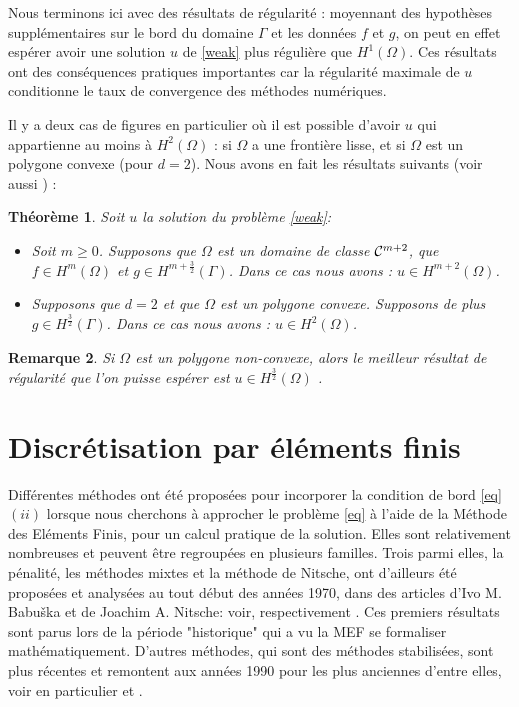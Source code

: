 \documentclass[11pt]{book}
\newtheorem{theorem}{Théorème}[section]
\newtheorem{remark}[theorem]{Remarque}
\newcommand{\bt}{\begin{theorem}}
\newcommand{\et}{\end{theorem}}
\newcommand{\br}{\begin{remark}}
\newcommand{\er}{\end{remark}}
\newcommand{\caC}{{\cal C}}
\begin{document}
Nous terminons ici avec des résultats de régularité : moyennant des hypothèses supplémentaires sur le bord du domaine $\Gamma$ et les données $f$ et $g$, on peut en effet espérer avoir une solution $u$ de \eqref{weak} plus régulière que $H^1(\Omega)$. Ces résultats ont des conséquences pratiques importantes car la régularité maximale de $u$ conditionne le taux de convergence des méthodes numériques.

Il y a deux cas de figures en particulier où il est possible d'avoir $u$ qui appartienne au moins à $H^2(\Omega)$ : si $\Omega$ a une frontière lisse, et si $\Omega$ est un polygone convexe (pour $d=2$). Nous avons en fait les résultats suivants \cite[Theorem 3.10, Theorem 3.12]{ern-guermond-04} (voir aussi \cite{grisvard-85,grisvard-86}) :

\bt Soit $u$ la solution du problème \eqref{weak}:
\begin{itemize}
\item Soit $m\geq0$. Supposons que $\Omega$ est un domaine de classe $\caC^{m+2}$, que $f \in H^m(\Omega)$ et $g \in H^{m+\frac32} (\Gamma)$. Dans ce cas nous avons : $u \in H^{m+2} (\Omega)$.
\item Supposons que $d=2$ et que $\Omega$ est un polygone convexe. Supposons de plus $g\in H^{\frac32} (\Gamma)$. Dans ce cas nous avons : $u\in H^2(\Omega)$.
\end{itemize}
\et

\br
Si $\Omega$ est un polygone non-convexe, alors le meilleur résultat de régularité que l'on puisse espérer est $u\in H^{\frac32} (\Omega)$ \cite[Remark 3.13]{ern-guermond-04}.
\er

\section{Discrétisation par éléments finis}
\label{sect:fem}

Différentes méthodes ont été proposées pour incorporer la condition de bord \eqref{eq} $(ii)$ lorsque nous cherchons à approcher le problème \eqref{eq} à l'aide de la Méthode des Eléments Finis, pour un calcul pratique de la solution. Elles sont relativement nombreuses et peuvent être regroupées en plusieurs familles. Trois parmi elles, la pénalité, les méthodes mixtes et la méthode de Nitsche, ont d'ailleurs été proposées et analysées au tout début des années 1970, dans des articles d'Ivo M. Babu\v{s}ka et de Joachim A. Nitsche: voir, respectivement  \cite{babuska-73a,babuska-73b,nitsche-71}. Ces premiers résultats sont parus lors de la période "historique" qui a vu la MEF se formaliser mathématiquement. D'autres méthodes, qui sont des méthodes stabilisées, sont plus récentes et remontent aux années 1990 pour les plus anciennes d'entre elles, voir en particulier \cite{barbosa-hughes-92a} et \cite{burman-2014}. 
\end{document}
